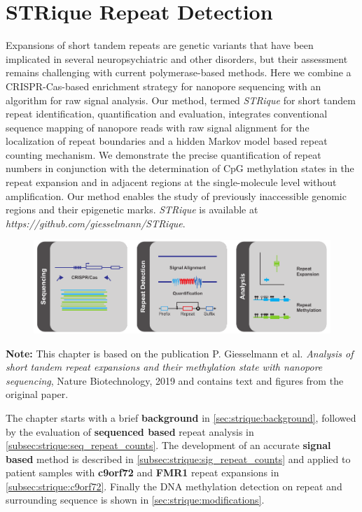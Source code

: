 \chapter{STRique Repeat Detection}
\label{cha:strique}

Expansions of short tandem repeats are genetic variants that have been implicated in several neuropsychiatric and other disorders, but their assessment remains challenging with current polymerase-based methods. Here we combine a CRISPR-Cas-based enrichment strategy for nanopore sequencing with an algorithm for raw signal analysis. Our method, termed \textit{STRique} for short tandem repeat identification, quantification and evaluation, integrates conventional sequence mapping of nanopore reads with raw signal alignment for the localization of repeat boundaries and a hidden Markov model based repeat counting mechanism. We demonstrate the precise quantification of repeat numbers in conjunction with the determination of CpG methylation states in the repeat expansion and in adjacent regions at the single-molecule level without amplification. Our method enables the study of previously inaccessible genomic regions and their epigenetic marks. \textit{STRique} is available at \textit{https://github.com/giesselmann/STRique}.

\begin{figure}[h]
    \centering
    \includegraphics[width=1.0\textwidth]{figures/strique/GA.pdf}
    \label{fig:strique:ga}
\end{figure}

\textbf{Note:} This chapter is based on the publication P. Giesselmann et al. \textit{Analysis of short tandem repeat expansions and their methylation state with nanopore sequencing}, Nature Biotechnology, 2019 and contains text and figures from the original paper.

The chapter starts with a brief \textbf{background} in \ref{sec:strique:background}, followed by the evaluation of \textbf{sequenced based} repeat analysis in \ref{subsec:strique:seq_repeat_counts}. The development of an accurate \textbf{signal based} method is described in \ref{subsec:strique:sig_repeat_counts} and applied to patient samples with \textbf{c9orf72} and \textbf{FMR1} repeat expansions in \ref{subsec:strique:c9orf72}. Finally the DNA methylation detection on repeat and surrounding sequence is shown in \ref{sec:strique:modifications}.




